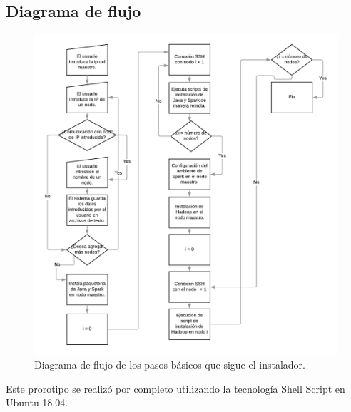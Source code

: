 \subsection{Diagrama de flujo}
\begin{figure}[H]
	\hypertarget{fig:diagramaFlujo}{\hspace{1pt}}
	\begin{center}
		\includegraphics{capitulo5/images/diagramaFlujo.png}
		\caption{Diagrama de flujo de los pasos básicos que sigue el instalador.}
	\end{center}
\end{figure}

Este prorotipo se realizó por completo utilizando la tecnología Shell Script en Ubuntu 18.04.

